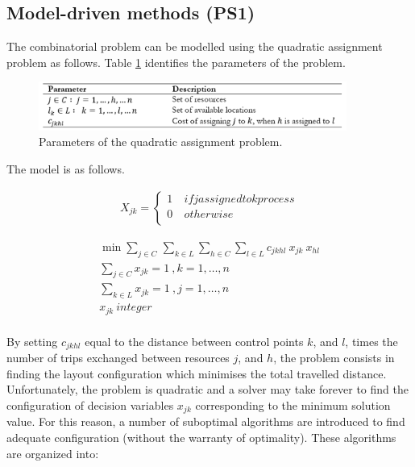 \subsection{Model-driven methods (PS1)}
The combinatorial problem can be modelled using the quadratic assignment problem as follows. Table \ref{tab_QAP} identifies the parameters of the problem.

\begin{figure}[hbt!]
\centering
\includegraphics[width=0.9\textwidth]{sectionProduction/design_plant_figures/tab_QAP.png}
\captionsetup{type=figure}
\caption{Parameters of the quadratic assignment problem.}
\label{tab_QAP}
\end{figure}

The model is as follows.

\begin{equation}
   \begin{split}
   X_{jk}=\left\{
                \begin{array}{ll}
                  1\ & if j assigned to k process\\
                  0 & otherwise\\
                \end{array}
              \right.
   \end{split}
\end{equation}

\begin{equation}
    \begin{split}
        \min{\sum_{j\in C\ }\sum_{k\in L}\sum_{h\in C}\sum_{l\in L}{c_{jkhl}\ x_{jk}\ x_{hl}}}\\
        \sum_{j\in C}{x_{jk}=1\ , k=1,\ldots,n}\\
        \sum_{k\in L}{x_{jk}=1\ , j=1,\ldots,n}\\
        x_{jk}\ integer\\
    \end{split}
\end{equation}

By setting $c_{jkhl}$ equal to the distance between control points $k$, and $l$, times the number of trips exchanged between resources $j$, and $h$, the problem consists in finding the layout configuration which minimises the total travelled distance. Unfortunately, the problem is quadratic and a solver may take forever to find the configuration of decision variables $x_{jk}$ corresponding to the minimum solution value. For this reason, a number of suboptimal algorithms are introduced to find adequate configuration (without the warranty of optimality). These algorithms are organized into:

